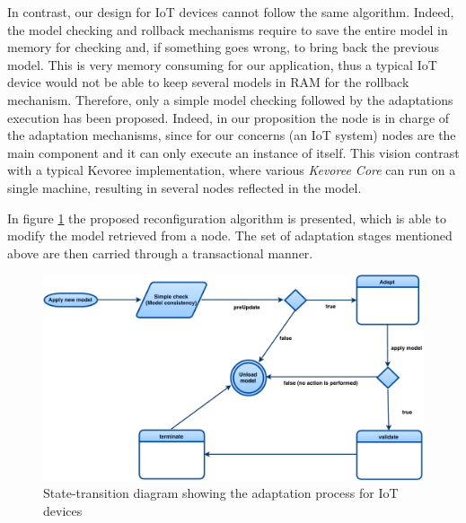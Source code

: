 In contrast, our design for IoT devices cannot follow the same algorithm.
Indeed, the model checking and rollback mechanisms require to save the entire model in memory for checking and, if something goes wrong, to bring back the previous model.
This is very memory consuming for our application, thus a typical IoT device would not be able to keep several models in RAM for the rollback mechanism.
Therefore, only a simple model checking followed by the adaptations execution has been proposed.
Indeed, in our proposition the node is in charge of the adaptation mechanisms, since for our concerns (an IoT system) nodes are the main component and it can only execute an instance of itself.
This vision contrast with a typical Kevoree implementation, where various \textit{Kevoree Core} can run on a single machine, resulting in several nodes reflected in the model.

In figure \ref{fig:MAR_modelListenerIoT} the proposed reconfiguration algorithm is presented, which is able to modify the model retrieved from a node.  The set of adaptation stages mentioned above are then carried through a transactional manner.

\begin{figure}[]
	\centering
	\includegraphics[width=0.85\columnwidth]{chapters/modelsAtRuntimeContiki.images/modelListenerIoT.pdf}
	\caption{State-transition diagram showing the adaptation process for IoT devices}
	\label{fig:MAR_modelListenerIoT}
\end{figure}

